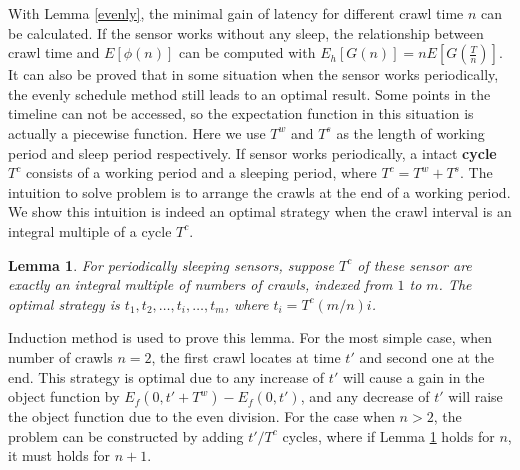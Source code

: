 \documentclass[conference]{IEEEtran}
\newtheorem{lemma}{Lemma}
\begin{document}
With Lemma \ref{evenly}, the minimal gain of latency for different crawl time $n$ can be calculated.
If the sensor works without any sleep, the relationship between crawl time and $E[\phi(n)]$ can be computed with $E_h[G(n)]=nE[G(\frac{T}{n})]$.
It can also be proved that in some situation when the sensor works periodically, the evenly schedule method still leads to an optimal result.
Some points in the timeline can not be accessed, so the expectation function in this situation is actually a piecewise function.
Here we use $T^{w}$ and $T^{s}$ as the length of working period and sleep period respectively.
If sensor works periodically, a intact \textbf{cycle} $T^{c}$ consists of a working period and a sleeping period, where $T^{c}=T^{w}+T^{s}$.
The intuition to solve problem is to arrange the crawls at the end of a working period.
We show this intuition is indeed an optimal strategy when the crawl interval is an integral multiple of a cycle $T^{c}$.
\begin{lemma}
\label{evenly_s}
For periodically sleeping sensors, suppose $T^{c}$ of these sensor are exactly an integral multiple of numbers of crawls, indexed from $1$ to $m$.
The optimal strategy is $t_1,t_2,\hdots,t_i,\hdots,t_m$, where $t_i=T^{c}(m/n)i$.
\end{lemma}
\begin{IEEEproof}
Induction method is used to prove this lemma.
For the most simple case, when number of crawls $n=2$, the first crawl locates at time $t'$ and second one at the end. 
This strategy is optimal due to any increase of $t'$ will cause a gain in the object function by $E_f(0,t'+T^{w})-E_f(0,t')$, and any decrease of $t'$ will raise the object function due to the even division.
For the case when $n>2$, the problem can be constructed by adding $t'/T^{c}$ cycles, where if Lemma \ref{evenly_s} holds for $n$, it must holds for $n+1$.
\end{IEEEproof}
\end{document}
